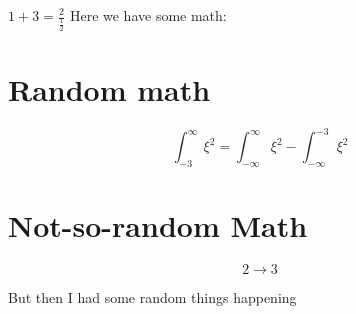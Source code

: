 \documentclass{article}
\begin{document}
  $ 1 + 3 = \frac{2}{\frac{1}{2}} $
Here we have some math:
\section{Random math}
\[
  \int_{-3}^{\infty} \xi^2 = \int_{-\infty}^{\infty} \xi^2 - \int_{-\infty}^{-3} \xi^2
\]
\section{Not-so-random Math}
\[
  2 \to 3
\]


But then I had some random things happening 
\end{document}
